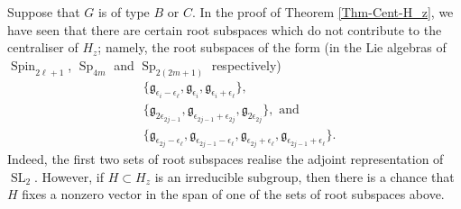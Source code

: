 \documentclass[11pt,oneside,dvipsnames]{amsart}
\theoremstyle{plain}
\theoremstyle{definition}
\theoremstyle{named}
\DeclareMathOperator{\SL}{SL}
\DeclareMathOperator{\Sp}{Sp}
\DeclareMathOperator{\Spin}{Spin}
\begin{document}
Suppose that $G$ is of type $B$ or $C$. In the proof of Theorem \ref{Thm-Cent-H_z}, we have seen that there are certain root subspaces which do not contribute to the centraliser of $H_z$; namely, the root subspaces of the form (in the Lie algebras of $\Spin_{2\ell+1}$, $\Sp_{4m}$ and $\Sp_{2(2m+1)}$ respectively)
\begingroup
\allowdisplaybreaks
\begin{align}
&\{\mathfrak{g}_{\epsilon_i-\epsilon_{\ell}},\mathfrak{g}_{\epsilon_{i}},\mathfrak{g}_{\epsilon_i+\epsilon_{\ell}}\},\label{eq-subsec-type-C-G'_z-1}\\
&\{\mathfrak{g}_{2\epsilon_{2j-1}},\mathfrak{g}_{\epsilon_{2j-1}+\epsilon_{2j}},\mathfrak{g}_{2\epsilon_{2j}}\},\text{ and}\label{eq-subsec-type-C-G'_z-2}\\
&\{\mathfrak{g}_{\epsilon_{2j}-\epsilon_{\ell}},\mathfrak{g}_{\epsilon_{2j-1}-\epsilon_{\ell}},\mathfrak{g}_{\epsilon_{2j}+\epsilon_{\ell}},\mathfrak{g}_{\epsilon_{2j-1}+\epsilon_{\ell}}\}.\label{eq-subsec-type-C-G'_z-3}
\end{align}
\endgroup
Indeed, the first two sets of root subspaces realise the adjoint representation of $\SL_2$. However, if $H\subset H_z$ is an irreducible subgroup, then there is a chance that $H$ fixes a nonzero vector in the span of one of the sets of root subspaces above. 
\end{document}

